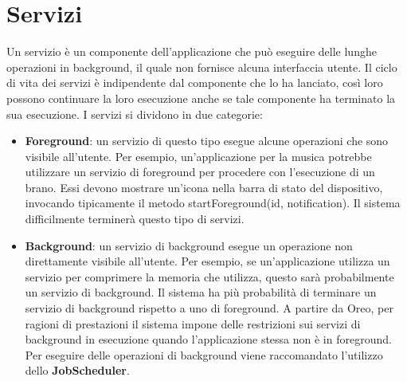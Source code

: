 \section{Servizi}
Un servizio è un componente dell'applicazione che può eseguire delle lunghe operazioni in background, il quale non fornisce alcuna interfaccia utente.
Il ciclo di vita dei servizi è indipendente dal componente che lo ha lanciato, così loro possono continuare la loro esecuzione anche se tale componente ha terminato la sua esecuzione. I servizi si dividono in due categorie:
\begin{itemize}
    \item \textbf{Foreground}: un servizio di questo tipo esegue alcune operazioni che sono visibile all'utente. Per esempio, un'applicazione per la musica potrebbe utilizzare un servizio di foreground per procedere con l'esecuzione di un brano. Essi devono mostrare un'icona nella barra di stato del dispositivo, invocando tipicamente il metodo startForeground(id, notification). Il sistema difficilmente terminerà questo tipo di servizi.
    \item \textbf{Background}: un servizio di background esegue un operazione non direttamente visibile all'utente. Per esempio, se un'applicazione utilizza un servizio per comprimere la memoria che utilizza, questo sarà probabilmente un servizio di background. Il sistema ha più probabilità di terminare un servizio di background rispetto a uno di foreground. A partire da Oreo, per ragioni di prestazioni il sistema impone delle restrizioni sui servizi di background in esecuzione quando l'applicazione stessa non è in foreground. Per eseguire delle operazioni di background viene raccomandato l'utilizzo dello \textbf{JobScheduler}.
\end{itemize}

